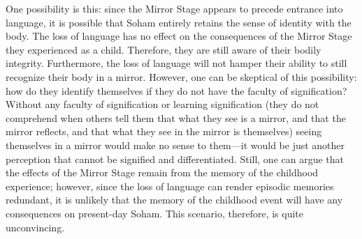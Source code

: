 One possibility is this: since the Mirror Stage appears to precede
entrance into language, it is possible that Soham entirely retains the
sense of identity with the body. The loss of language has no effect on
the consequences of the Mirror Stage they experienced as a child.
Therefore, they are still aware of their bodily integrity. Furthermore,
the loss of language will not hamper their ability to still recognize
their body in a mirror. However, one can be skeptical of this
possibility: how do they identify themselves if they do not have the
faculty of signification? Without any faculty of signification or
learning signification (they do not comprehend when others tell them
that what they see is a mirror, and that the mirror reflects, and that
what they see in the mirror is themselves) seeing themselves in a mirror
would make no sense to them---it would be just another perception that
cannot be signified and differentiated. Still, one can argue that the
effects of the Mirror Stage remain from the memory of the childhood
experience; however, since the loss of language can render episodic
memories redundant, it is unlikely that the memory of the childhood
event will have any consequences on present-day Soham. This scenario,
therefore, is quite unconvincing.

